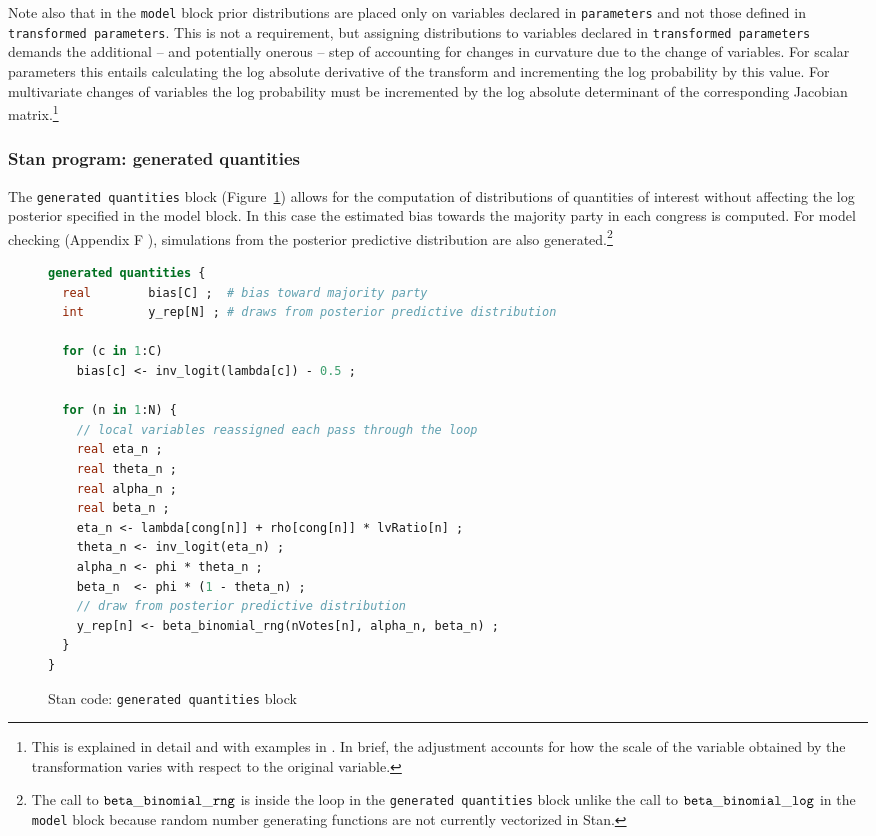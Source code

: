 Note also that in the {\tt model} block prior distributions are placed only on variables declared 
in {\tt parameters}  and not those defined in {\tt transformed parameters}. This is not a requirement, 
but assigning distributions to variables declared in {\tt transformed parameters} demands the 
additional -- and potentially onerous -- step of accounting for changes in curvature due to the 
change of variables. For scalar parameters this entails calculating the log absolute derivative of 
the transform and incrementing the log probability by this value. For multivariate changes of variables 
the log probability must be incremented by the log absolute determinant of the corresponding 
Jacobian matrix.\footnote{This is explained in detail and with examples in 
. In brief, the adjustment accounts for how 
the scale of the variable obtained by the transformation varies with respect to the 
original variable.}



\subsubsection{Stan program: generated quantities}

The {\tt generated quantities} block (Figure~\ref{stan_generated_quantities}) allows for the computation 
of distributions of quantities of interest without affecting the log posterior specified in the model block. 
In this case the estimated bias towards the majority party in each congress is computed. For model 
checking (Appendix F %
), simulations from the posterior predictive distribution 
are also generated.\footnote{The call to ${\tt beta\_binomial\_rng}$ is inside the loop in the 
{\tt generated quantities} block unlike the call to ${\tt beta\_binomial\_log}$ in the {\tt model} block because 
random number generating functions are not currently vectorized in Stan.} 


\begin{figure}[h]
\begin{lstlisting}[language=Stan, frame=trBL]
generated quantities {
  real        bias[C] ;  # bias toward majority party
  int         y_rep[N] ; # draws from posterior predictive distribution
  
  for (c in 1:C) 
    bias[c] <- inv_logit(lambda[c]) - 0.5 ;
  
  for (n in 1:N) {
    // local variables reassigned each pass through the loop
    real eta_n ;
    real theta_n ;
    real alpha_n ;
    real beta_n ;
    eta_n <- lambda[cong[n]] + rho[cong[n]] * lvRatio[n] ;
    theta_n <- inv_logit(eta_n) ;    
    alpha_n <- phi * theta_n ;
    beta_n  <- phi * (1 - theta_n) ;
    // draw from posterior predictive distribution
    y_rep[n] <- beta_binomial_rng(nVotes[n], alpha_n, beta_n) ;
  }
}
\end{lstlisting}
\caption{Stan code: {\tt generated quantities} block}
\label{stan_generated_quantities}
\end{figure}

\clearpage


